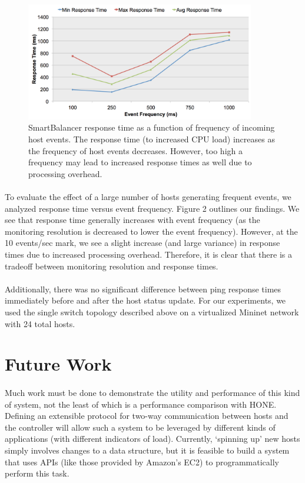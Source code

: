 \documentclass[10pt]{article}
\begin{document}
\begin{figure}[ht!]
\centering
\includegraphics[width=100mm]{responseTime.png}
\caption{SmartBalancer response time as a function of frequency of incoming host events. The response time (to increased CPU load) increases as the frequency of host events decreases. However, too high a frequency may lead to increased response times as well due to processing overhead.}
\label{pic:responseTime}
\end{figure}
\paragraph{} To evaluate the effect of a large number of hosts generating frequent events, we analyzed response time versus event frequency. Figure 2 outlines our findings. We see that response time generally increases with event frequency (as the monitoring resolution is decreased to lower the event frequency). However, at the 10 events/sec mark, we see a slight increase (and large variance) in response times due to increased processing overhead. Therefore, it is clear that there is a tradeoff between monitoring resolution and response times.

\paragraph{} Additionally, there was no significant difference between ping response times immediately before and after the host status update. For our experiments, we used the single switch topology described above on a virtualized Mininet network with 24 total hosts.

\section{Future Work}
\label{sec:future}

\paragraph{} Much work must be done to demonstrate the utility and performance of this kind of system, not the least of which is a performance comparison with HONE\cite{HONE}. Defining an extensible protocol for two-way communication between hosts and the controller will allow such a system to be leveraged by different kinds of applications (with different indicators of load). Currently, ‘spinning up’ new hosts simply involves changes to a data structure, but it is feasible to build a system that uses APIs (like those provided by Amazon’s EC2) to programmatically perform this task.
\end{document}
